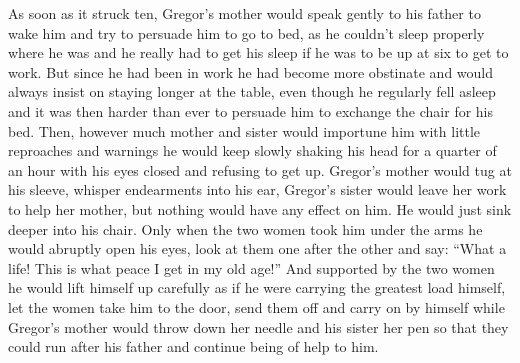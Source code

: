 \documentclass[12pt]{report}
\begin{document}
As soon as it struck ten, Gregor's mother would speak gently to his
father to wake him and try to persuade him to go to bed, as he couldn't
sleep properly where he was and he really had to get his sleep if he was
to be up at six to get to work. But since he had been in work he had
become more obstinate and would always insist on staying longer at the
table, even though he regularly fell asleep and it was then harder than
ever to persuade him to exchange the chair for his bed. Then, however
much mother and sister would importune him with little reproaches and
warnings he would keep slowly shaking his head for a quarter of an hour
with his eyes closed and refusing to get up. Gregor's mother would tug
at his sleeve, whisper endearments into his ear, Gregor's sister would
leave her work to help her mother, but nothing would have any effect on
him. He would just sink deeper into his chair. Only when the two women
took him under the arms he would abruptly open his eyes, look at them
one after the other and say: ``What a life! This is what peace I get in
my old age!'' And supported by the two women he would lift himself up
carefully as if he were carrying the greatest load himself, let the
women take him to the door, send them off and carry on by himself while
Gregor's mother would throw down her needle and his sister her pen so
that they could run after his father and continue being of help to him.
\end{document}
